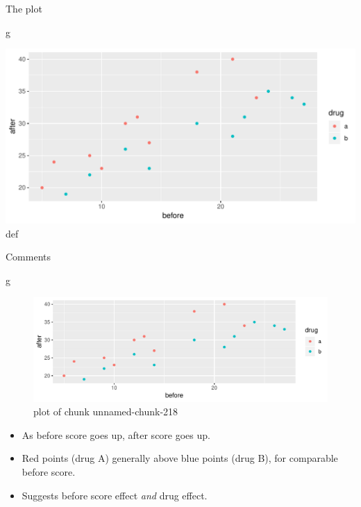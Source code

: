 \documentclass[ignorenonframetext,]{beamer}
\newenvironment{Shaded}{\begin{snugshade}}{\end{snugshade}}
\newcommand{\NormalTok}[1]{#1}
\begin{document}
\begin{frame}[fragile]{The plot}
\protect\hypertarget{the-plot-5}{}

\begin{Shaded}
\begin{Highlighting}[]
\NormalTok{g}
\end{Highlighting}
\end{Shaded}

\includegraphics{figure/spizzo-1.pdf} def

\end{frame}

\begin{frame}[fragile]{Comments}
\protect\hypertarget{comments-17}{}

\begin{Shaded}
\begin{Highlighting}[]
\NormalTok{g}
\end{Highlighting}
\end{Shaded}

\begin{figure}
\centering
\includegraphics{figure/unnamed-chunk-218-1.pdf}
\caption{plot of chunk unnamed-chunk-218}
\end{figure}

\begin{itemize}
\item
  As before score goes up, after score goes up.
\item
  Red points (drug A) generally above blue points (drug B), for
  comparable before score.
\item
  Suggests before score effect \emph{and} drug effect.
\end{itemize}

\end{frame}
\end{document}
